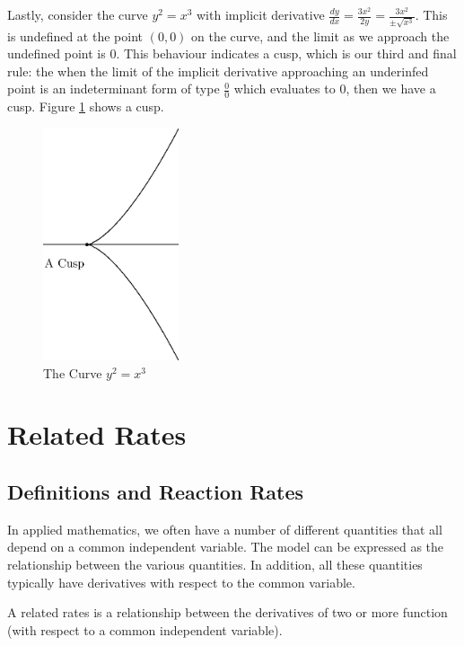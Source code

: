 \documentclass[fleqn]{report}
\begin{document}
\begin{example}
Lastly, consider the curve $y^2 = x^3$ with implicit
derivative $\frac{dy}{dx} = \frac{3x^2}{2y} = \frac{3x^2}{\pm
\sqrt{x^3}}$. This is undefined at the point $(0,0)$ on the
curve, and the limit as we approach the undefined point is
$0$. This behaviour indicates a cusp, which is our third and
final rule: the when the limit of the implicit derivative
approaching an underinfed point is an indeterminant form of
type $\frac{0}{0}$ which evaluates to $0$, then we have a
cusp. Figure \ref{figure-elliptic-curve2} shows a cusp.
\end{example}

\begin{figure}[ht]
\centering
\includegraphics[width=4cm]{figure06.eps}
\caption{The Curve $y^2 = x^3$}
\label{figure-elliptic-curve2}
\end{figure}

\section{Related Rates}
\label{related-rates}

\subsection{Definitions and Reaction Rates}
\label{related-rates-definition}

In applied mathematics, we often have a number of different
quantities that all depend on a common independent variable.
The model can be expressed as the relationship between the various
quantities. In addition, all these quantities typically have
derivatives with respect to the common variable. 

\begin{defn}
A related rates is a relationship between the derivatives of
two or more function (with respect to a common independent
variable).
\end{defn}
\end{document}
